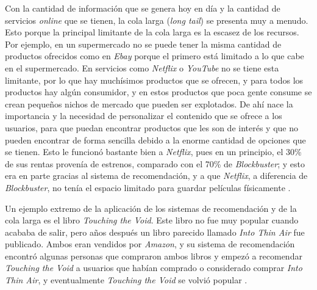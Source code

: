 Con la cantidad de información que se genera hoy en día y la cantidad de servicios \textit{online} que se tienen, la cola larga (\textit{long tail}) se presenta muy a menudo. Esto porque la principal limitante de la cola larga es la escasez de los recursos. Por ejemplo, en un supermercado no se puede tener la misma cantidad de productos ofrecidos como en \textit{Ebay} porque el primero está limitado a lo que cabe en el supermercado. En servicios como \textit{Netflix} o \textit{YouTube} no se tiene esta limitante, por lo que hay muchísimos productos que se ofrecen, y para todos los productos hay algún consumidor, y en estos productos que poca gente consume se crean pequeños nichos de mercado que pueden ser explotados. De ahí nace la importancia y la necesidad de personalizar el contenido que se ofrece a los usuarios, para que puedan encontrar productos que les son de interés y que no pueden encontrar de forma sencilla debido a la enorme cantidad de opciones que se tienen. Esto le funcionó bastante bien a \textit{Netflix}, pues en un principio, el 30\% de sus rentas provenía de estrenos, comparado con el 70\% de \textit{Blockbuster}; y esto era en parte gracias al sistema de recomendación, y a que \textit{Netflix}, a diferencia de \textit{Blockbuster}, no tenía el espacio limitado para guardar películas físicamente \cite{bloombergnetflixsales}.


Un ejemplo extremo de la aplicación de los sistemas de recomendación y de la cola larga es el libro \textit{Touching the Void}. Este libro no fue muy popular cuando acababa de salir, pero años después un libro parecido llamado \textit{Into Thin Air} fue publicado. Ambos eran vendidos por \textit{Amazon}, y su sistema de recomendación encontró algunas personas que compraron ambos libros y empezó a recomendar \textit{Touching the Void} a usuarios que habían comprado o considerado comprar \textit{Into Thin Air}, y eventualmente \textit{Touching the Void} se volvió popular \cite{leskovec_mining_2014}.


